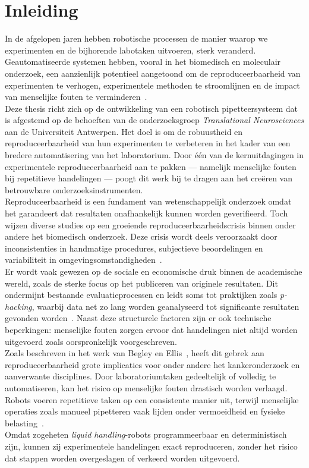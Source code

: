 \chapter{Inleiding}

In de afgelopen jaren hebben robotische processen de manier waarop we experimenten en de bijhorende labotaken uitvoeren, sterk veranderd. Geautomatiseerde systemen hebben, vooral in het biomedisch en moleculair onderzoek, een aanzienlijk potentieel aangetoond om de reproduceerbaarheid van experimenten te verhogen, experimentele methoden te stroomlijnen en de impact van menselijke fouten te verminderen\ \cite{RN5}.
\\[12pt]Deze thesis richt zich op de ontwikkeling van een robotisch pipetteersysteem dat is afgestemd op de behoeften van de onderzoeksgroep \textit{Translational Neurosciences} aan de Universiteit Antwerpen. Het doel is om de robuustheid en reproduceerbaarheid van hun experimenten te verbeteren in het kader van een bredere automatisering van het laboratorium. Door één van de kernuitdagingen in experimentele reproduceerbaarheid aan te pakken — namelijk menselijke fouten bij repetitieve handelingen — poogt dit werk bij te dragen aan het creëren van betrouwbare onderzoeksinstrumenten.
\\[12pt]Reproduceerbaarheid is een fundament van wetenschappelijk onderzoek omdat het garandeert dat resultaten onafhankelijk kunnen worden geverifieerd. Toch wijzen diverse studies op een groeiende reproduceerbaarheidscrisis binnen onder andere het biomedisch onderzoek. Deze crisis wordt deels veroorzaakt door inconsistenties in handmatige procedures, subjectieve beoordelingen en variabiliteit in omgevingsomstandigheden\ \cite{RN2}. 
\\[12pt]Er wordt vaak gewezen op de sociale en economische druk binnen de academische wereld, zoals de sterke focus op het publiceren van originele resultaten. Dit ondermijnt bestaande evaluatieprocessen en leidt soms tot praktijken zoals \textit{p-hacking}, waarbij data net zo lang worden geanalyseerd tot significante resultaten gevonden worden\ \cite{RN2,RN6}. Naast deze structurele factoren zijn er ook technische beperkingen: menselijke fouten zorgen ervoor dat handelingen niet altijd worden uitgevoerd zoals oorspronkelijk voorgeschreven.
\\[12pt]Zoals beschreven in het werk van Begley en Ellis\ \cite{RN4}, heeft dit gebrek aan reproduceerbaarheid grote implicaties voor onder andere het kankeronderzoek en aanverwante disciplines. Door laboratoriumtaken gedeeltelijk of volledig te automatiseren, kan het risico op menselijke fouten drastisch worden verlaagd. Robots voeren repetitieve taken op een consistente manier uit, terwijl menselijke operaties zoals manueel pipetteren vaak lijden onder vermoeidheid en fysieke belasting\ \cite{RN9}. 
\\[12pt]Omdat zogeheten \textit{liquid handling}-robots programmeerbaar en deterministisch zijn, kunnen zij experimentele handelingen exact reproduceren, zonder het risico dat stappen worden overgeslagen of verkeerd worden uitgevoerd.

